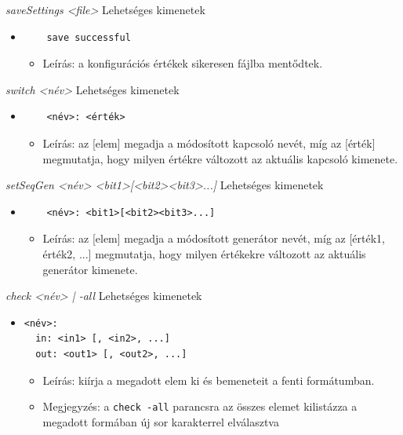 \textit{saveSettings <file>}\newline
Lehetséges kimenetek
\begin{itemize}
	\item
	\begin{verbatim}
	save successful
	\end{verbatim}
	\begin{itemize}
		\item Leírás: a konfigurációs értékek sikeresen fájlba mentődtek.
	\end{itemize}
\end{itemize}

\textit{switch <név>}\newline
Lehetséges kimenetek
\begin{itemize}
	\item
	\begin{verbatim}
	<név>: <érték>
	\end{verbatim}
	\begin{itemize}
		\item Leírás: az [elem] megadja a módosított kapcsoló nevét, míg az [érték] megmutatja, hogy milyen értékre változott az aktuális kapcsoló kimenete. 
	\end{itemize}
\end{itemize}

\textit{setSeqGen <név> <bit1>[<bit2><bit3>...]}\newline
Lehetséges kimenetek
\begin{itemize}
	\item 
	\begin{verbatim}
	<név>: <bit1>[<bit2><bit3>...]
	\end{verbatim}
	\begin{itemize}
		\item Leírás: az [elem] megadja a módosított generátor nevét, míg az [érték1, érték2, ...] megmutatja, hogy milyen értékekre változott az aktuális generátor kimenete. 
	\end{itemize}
\end{itemize}

\textit{check <név> | -all}\newline
Lehetséges kimenetek
\begin{itemize}
	\item
	\begin{verbatim}
<név>:
  in: <in1> [, <in2>, ...]
  out: <out1> [, <out2>, ...]
	\end{verbatim}
	\begin{itemize}
		\item Leírás: kiírja a megadott elem ki és bemeneteit a fenti formátumban.
		\item Megjegyzés: a \texttt{check -all} parancsra az összes elemet kilistázza a megadott formában új sor karakterrel elválasztva
	\end{itemize}
\end{itemize}

